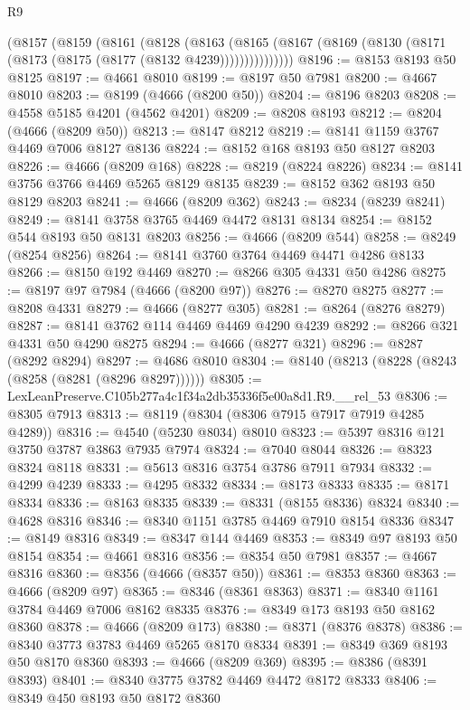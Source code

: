 \begin{lexlean}{R9}
\begin{coremodule}
      (@8157
        (@8159
          (@8161
            (@8128
              (@8163
                (@8165 (@8167 (@8169 (@8130 (@8171 (@8173 (@8175 (@8177 (@8132 @4239)))))))))))))))
@8196 := @8153 @8193 @50 @8125
@8197 := @4661 @8010
@8199 := @8197 @50 @7981
@8200 := @4667 @8010
@8203 := @8199 (@4666 (@8200 @50))
@8204 := @8196 @8203
@8208 := @4558 @5185 @4201 (@4562 @4201)
@8209 := @8208 @8193
@8212 := @8204 (@4666 (@8209 @50))
@8213 := @8147 @8212
@8219 := @8141 @1159 @3767 @4469 @7006 @8127 @8136
@8224 := @8152 @168 @8193 @50 @8127 @8203
@8226 := @4666 (@8209 @168)
@8228 := @8219 (@8224 @8226)
@8234 := @8141 @3756 @3766 @4469 @5265 @8129 @8135
@8239 := @8152 @362 @8193 @50 @8129 @8203
@8241 := @4666 (@8209 @362)
@8243 := @8234 (@8239 @8241)
@8249 := @8141 @3758 @3765 @4469 @4472 @8131 @8134
@8254 := @8152 @544 @8193 @50 @8131 @8203
@8256 := @4666 (@8209 @544)
@8258 := @8249 (@8254 @8256)
@8264 := @8141 @3760 @3764 @4469 @4471 @4286 @8133
@8266 := @8150 @192 @4469
@8270 := @8266 @305 @4331 @50 @4286
@8275 := @8197 @97 @7984 (@4666 (@8200 @97))
@8276 := @8270 @8275
@8277 := @8208 @4331
@8279 := @4666 (@8277 @305)
@8281 := @8264 (@8276 @8279)
@8287 := @8141 @3762 @114 @4469 @4469 @4290 @4239
@8292 := @8266 @321 @4331 @50 @4290 @8275
@8294 := @4666 (@8277 @321)
@8296 := @8287 (@8292 @8294)
@8297 := @4686 @8010
@8304 := @8140 (@8213 (@8228 (@8243 (@8258 (@8281 (@8296 @8297))))))
@8305 := LexLeanPreserve.C105b277a4c1f34a2db35336f5e00a8d1.R9.__rel_53
@8306 := @8305 @7913
@8313 := @8119 (@8304 (@8306 @7915 @7917 @7919 @4285 @4289))
@8316 := @4540 (@5230 @8034) @8010
@8323 := @5397 @8316 @121 @3750 @3787 @3863 @7935 @7974
@8324 := @7040 @8044
@8326 := @8323 @8324 @8118
@8331 := @5613 @8316 @3754 @3786 @7911 @7934
@8332 := @4299 @4239
@8333 := @4295 @8332
@8334 := @8173 @8333
@8335 := @8171 @8334
@8336 := @8163 @8335
@8339 := @8331 (@8155 @8336) @8324
@8340 := @4628 @8316
@8346 := @8340 @1151 @3785 @4469 @7910 @8154 @8336
@8347 := @8149 @8316
@8349 := @8347 @144 @4469
@8353 := @8349 @97 @8193 @50 @8154
@8354 := @4661 @8316
@8356 := @8354 @50 @7981
@8357 := @4667 @8316
@8360 := @8356 (@4666 (@8357 @50))
@8361 := @8353 @8360
@8363 := @4666 (@8209 @97)
@8365 := @8346 (@8361 @8363)
@8371 := @8340 @1161 @3784 @4469 @7006 @8162 @8335
@8376 := @8349 @173 @8193 @50 @8162 @8360
@8378 := @4666 (@8209 @173)
@8380 := @8371 (@8376 @8378)
@8386 := @8340 @3773 @3783 @4469 @5265 @8170 @8334
@8391 := @8349 @369 @8193 @50 @8170 @8360
@8393 := @4666 (@8209 @369)
@8395 := @8386 (@8391 @8393)
@8401 := @8340 @3775 @3782 @4469 @4472 @8172 @8333
@8406 := @8349 @450 @8193 @50 @8172 @8360

\end{coremodule}
\end{lexlean}
